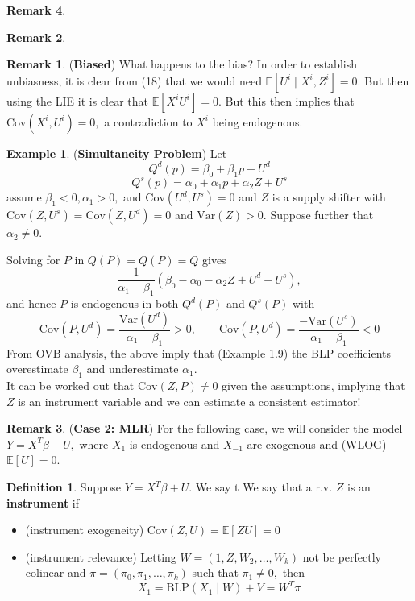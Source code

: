 \documentclass[10pt, oneside]{article}
\newcommand{\Var}{\text{Var}}
\newcommand{\Cov}{\text{Cov}}
\newcommand{\bbE}{\mathbb{E}}
\theoremstyle{definition}
\newtheorem{exmp}{Example}[section]
\newtheorem{defn}{Definition}
\newtheorem{rem}{Remark}
\begin{document}
\begin{rem}
\begin{rem}
\begin{rem}
    (\textbf{Biased}) What happens to the bias? In order to establish unbiasness, it is clear from (18) that we would need $\bbE[U^i \mid X^i, Z^i]= 0.$ But then using the LIE it is clear that $\bbE[X^iU^i] = 0.$ But this then implies that $\Cov(X^i, U^i) = 0,$ a contradiction to $X^i$ being endogenous.
\end{rem}

\begin{exmp}
    (\textbf{Simultaneity Problem})
Let 
                \[Q^d(p) = \beta_0 + \beta_1 p + U^d\]
                \[Q^s(p) = \alpha_0 + \alpha_1 p + \alpha_2 Z + U^s\]
assume $\beta_1 < 0, \alpha_1 >0,$ and $\Cov(U^d, U^s) = 0$ and $Z$ is a supply shifter with $\Cov(Z,U^s) = \Cov(Z,U^d) = 0$ and $\Var(Z)>0.$ Suppose further that $\alpha_2 \neq 0.$ 


Solving for $P$ in $Q(P) = Q(P) = Q$ gives 
\[\frac{1}{\alpha_1 - \beta_1}(\beta_0 - \alpha_0 - \alpha_2 Z + U^d - U^s),\] and hence $P$ is endogenous in both $Q^d(P)$ and $Q^s(P)$ with 
\[\Cov(P,U^d) = \frac{\Var(U^d)}{\alpha_1-\beta_1}>0 ,\qquad \Cov(P,U^d) = \frac{-\Var(U^s)}{\alpha_1-\beta_1} <0\] From OVB analysis, the above imply that (Example 1.9) the BLP coefficients overestimate $\beta_1$ and underestimate $\alpha_1.$\\

It can be worked out that $\Cov(Z,P) \neq 0$ given the assumptions, implying that $Z$ is an instrument variable and we can estimate a consistent estimator!
\end{exmp}
\end{rem}

\hline


\begin{rem}
    (\textbf{Case 2: MLR})    For the following case, we will consider the model $Y = X^T\beta + U,$ where $X_1$ is endogenous and $X_{-1}$ are exogenous and (WLOG) $\bbE[U] = 0.$
\begin{defn}
    Suppose $Y = X^T\beta + U.$ We say t We say that a r.v. $Z$ is an \textbf{instrument} if 
        \begin{itemize}
            \item (instrument exogeneity) $\Cov(Z,U) = \bbE[ZU]= 0$ 
            \item (instrument relevance) Letting $W = (1, Z, W_2, \dots, W_k)$ not be perfectly colinear and $\pi = (\pi_0, \pi_1, \dots, \pi_k)$ such that $\pi_1 \neq 0,$ then 
            \[X_1 = \text{BLP}(X_1 \mid W) + V = W^T\pi\]
        \end{itemize} 
\end{defn}


\end{rem}
\end{rem}
\end{document}
